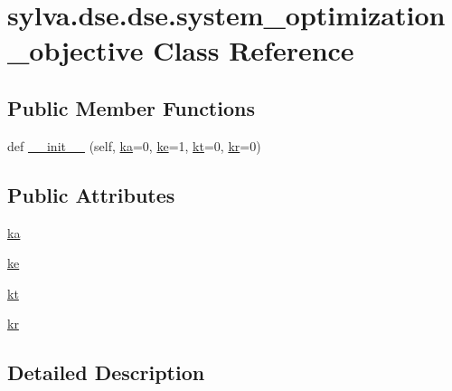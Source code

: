 \hypertarget{classsylva_1_1dse_1_1dse_1_1system__optimization__objective}{}\section{sylva.\+dse.\+dse.\+system\+\_\+optimization\+\_\+objective Class Reference}
\label{classsylva_1_1dse_1_1dse_1_1system__optimization__objective}
\subsection*{Public Member Functions}
\begin{DoxyCompactItemize}
\item 
def \hyperlink{classsylva_1_1dse_1_1dse_1_1system__optimization__objective_a6c62d0bd035bb3b1742455fa9de0105c}{\+\_\+\+\_\+init\+\_\+\+\_\+} (self, \hyperlink{classsylva_1_1dse_1_1dse_1_1system__optimization__objective_a383b22e931aebb44b887232ffd24455c}{ka}=0, \hyperlink{classsylva_1_1dse_1_1dse_1_1system__optimization__objective_acff77d871bb2bc6926a2caaaa9d7fdae}{ke}=1, \hyperlink{classsylva_1_1dse_1_1dse_1_1system__optimization__objective_a59231a6e2fed5147fff8abf74f62fd42}{kt}=0, \hyperlink{classsylva_1_1dse_1_1dse_1_1system__optimization__objective_a73ce6545b627384a6a7b338f87dde1c7}{kr}=0)
\end{DoxyCompactItemize}
\subsection*{Public Attributes}
\begin{DoxyCompactItemize}
\item 
\hyperlink{classsylva_1_1dse_1_1dse_1_1system__optimization__objective_a383b22e931aebb44b887232ffd24455c}{ka}
\item 
\hyperlink{classsylva_1_1dse_1_1dse_1_1system__optimization__objective_acff77d871bb2bc6926a2caaaa9d7fdae}{ke}
\item 
\hyperlink{classsylva_1_1dse_1_1dse_1_1system__optimization__objective_a59231a6e2fed5147fff8abf74f62fd42}{kt}
\item 
\hyperlink{classsylva_1_1dse_1_1dse_1_1system__optimization__objective_a73ce6545b627384a6a7b338f87dde1c7}{kr}
\end{DoxyCompactItemize}


\subsection{Detailed Description}


